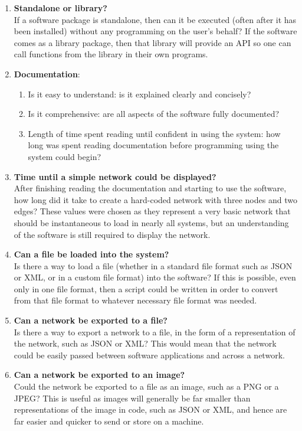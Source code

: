 \documentclass[../dissertation.tex]{subfiles}
\begin{document}
\begin{enumerate}
	\item \textbf{Standalone or library?}\\
	If a software package is standalone, then can it be executed (often after it has been installed) without any programming on the user's behalf? If the software comes as a library package, then that library will provide an API so one can call functions from the library in their own programs. 
	\item \textbf{Documentation}:
	\begin{enumerate}
		\item Is it easy to understand: is it explained clearly and concisely?
		\item Is it comprehensive: are all aspects of the software fully documented?
		\item Length of time spent reading until confident in using the system: how long was spent reading documentation before programming using the system could begin?
	\end{enumerate}
	\item \textbf{Time until a simple network could be displayed?}\\
	After finishing reading the documentation and starting to use the software, how long did it take to create a hard-coded network with three nodes and two edges? These values were chosen as they represent a very basic network that should be instantaneous to load in nearly all systems, but an understanding of the software is still required to display the network.
	\item \textbf{Can a file be loaded into the system?}\\
	Is there a way to load a file (whether in a standard file format such as JSON or XML, or in a custom file format) into the software? If this is possible, even only in one file format, then a script could be written in order to convert from that file format to whatever necessary file format was needed. 
	\item \textbf{Can a network be exported to a file?}\\
	Is there a way to export a network to a file, in the form of a representation of the network, such as JSON or XML? This would mean that the network could be easily passed between software applications and across a network.
	\item \textbf{Can a network be exported to an image?}\\
	Could the network be exported to a file as an image, such as a PNG or a JPEG? This is useful as images will generally be far smaller than representations of the image in code, such as JSON or XML, and hence are far easier and quicker to send or store on a machine.

\end{enumerate}
\end{document}
